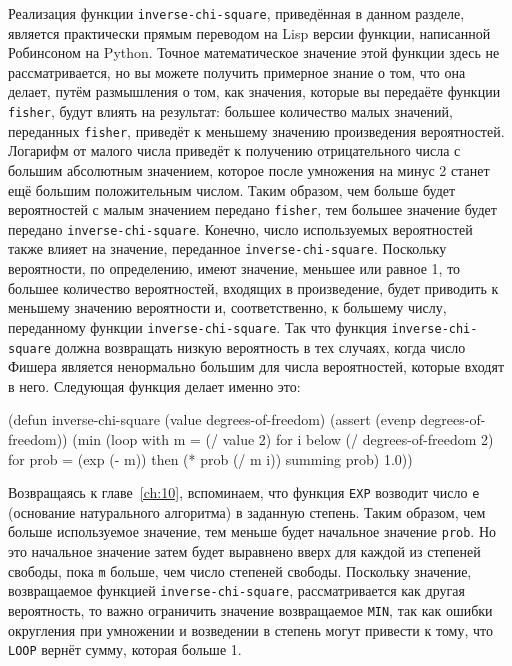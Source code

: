 Реализация функции \lstinline{inverse-chi-square}, приведённая в данном разделе, является
практически прямым переводом на Lisp версии функции, написанной Робинсоном на Python.
Точное математическое значение этой функции здесь не рассматривается, но вы можете
получить примерное знание о том, что она делает, путём размышления о том, как значения,
которые вы передаёте функции \lstinline{fisher}, будут влиять на результат: большее количество
малых значений, переданных \lstinline{fisher}, приведёт к меньшему значению произведения
вероятностей.  Логарифм от малого числа приведёт к получению отрицательного числа с
большим абсолютным значением, которое после умножения на минус 2 станет ещё большим
положительным числом.  Таким образом, чем больше будет вероятностей с малым значением
передано \lstinline{fisher}, тем большее значение будет передано
\lstinline{inverse-chi-square}. Конечно, число используемых вероятностей также влияет на
значение, переданное \lstinline{inverse-chi-square}.  Поскольку вероятности, по определению,
имеют значение, меньшее или равное 1, то большее количество вероятностей, входящих в
произведение, будет приводить к меньшему значению вероятности и, соответственно, к
большему числу, переданному функции \lstinline{inverse-chi-square}.  Так что функция
\lstinline{inverse-chi-square} должна возвращать низкую вероятность в тех случаях, когда число
Фишера является ненормально большим для числа вероятностей, которые входят в него.
Следующая функция делает именно это:

\begin{myverb}
(defun inverse-chi-square (value degrees-of-freedom)
  (assert (evenp degrees-of-freedom))
  (min 
   (loop with m = (/ value 2)
      for i below (/ degrees-of-freedom 2)
      for prob = (exp (- m)) then (* prob (/ m i))
      summing prob)
   1.0))
\end{myverb}

Возвращаясь к главе~\ref{ch:10}, вспоминаем, что функция \lstinline{EXP} возводит число
\lstinline{e} (основание натурального алгоритма) в заданную степень.  Таким образом, чем больше
используемое значение, тем меньше будет начальное значение \lstinline{prob}.  Но это начальное
значение затем будет выравнено вверх для каждой из степеней свободы, пока \lstinline{m} больше,
чем число степеней свободы.  Поскольку значение, возвращаемое функцией
\lstinline{inverse-chi-square}, рассматривается как другая вероятность, то важно ограничить
значение возвращаемое \lstinline{MIN}, так как ошибки округления при умножении и возведении в
степень могут привести к тому, что \lstinline{LOOP} вернёт сумму, которая больше 1.

